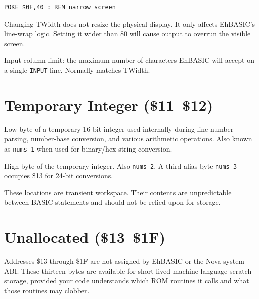 \begin{lstlisting}
POKE $0F,40 : REM narrow screen
\end{lstlisting}

\begin{warningbox}
Changing TWidth does not resize the physical display.  It only affects
EhBASIC's line-wrap logic.  Setting it wider than 80 will cause output to
overrun the visible screen.
\end{warningbox}


Input column limit: the maximum number of characters EhBASIC will accept on a
single \texttt{INPUT} line.  Normally matches TWidth.

\section{Temporary Integer (\$11--\$12)}


Low byte of a temporary 16-bit integer used internally during line-number
parsing, number-base conversion, and various arithmetic operations.  Also
known as \texttt{nums\_1} when used for binary/hex string conversion.


High byte of the temporary integer.  Also \texttt{nums\_2}.  A third alias
byte \texttt{nums\_3} occupies \$13 for 24-bit conversions.

These locations are transient workspace.  Their contents are unpredictable
between BASIC statements and should not be relied upon for storage.

\section{Unallocated (\$13--\$1F)}

Addresses \$13 through \$1F are not assigned by EhBASIC or the Nova system
ABI.  These thirteen bytes are available for short-lived machine-language
scratch storage, provided your code understands which ROM routines it calls
and what those routines may clobber.

